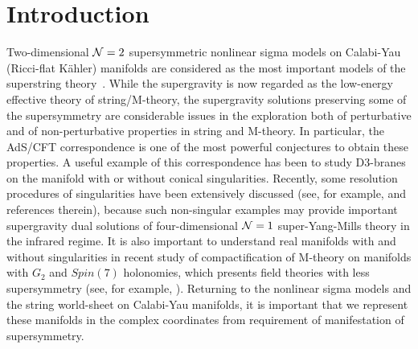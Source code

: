 \documentclass[a4paper,11pt]{article}
\begin{document}
{\begin{titlepage}
\begin{abstract}
\end{abstract}

\end{titlepage}



\section{Introduction} \label{intro}

Two-dimensional ${\cal N}=2$ supersymmetric nonlinear sigma models 
on Calabi-Yau (Ricci-flat K\"{a}hler) manifolds 
are considered as the most important models 
of the superstring theory~\cite{Zu,finite,GVZ,NS}. 
While the supergravity is 
now regarded as the low-energy effective theory of string/M-theory, 
the supergravity solutions preserving some of the supersymmetry 
are considerable issues in the exploration both
of perturbative and of non-perturbative properties 
in string and M-theory. 
In particular,
the AdS/CFT correspondence is one of the most powerful conjectures
to obtain these properties.
A useful example of this correspondence has been to study D3-branes on
the manifold with or without conical singularities.  
Recently, 
some resolution procedures of singularities have been extensively
discussed 
(see, for example, \cite{KleTsey,KleStr,PT,CLP,PapTsey,CGLP} 
and references therein),
because 
such non-singular examples may provide important supergravity dual
solutions of four-dimensional ${\cal N}=1$ super-Yang-Mills theory in
the infrared regime.  
It is also important to understand real manifolds 
with and without singularities 
in recent study of compactification of M-theory on 
manifolds with
$G_2$ and $Spin(7)$ holonomies, which presents 
field theories with less supersymmetry 
(see, for example,
\cite{Spin7,Ach,ES,AW,GLPS}). 
Returning to
the nonlinear sigma models and the string world-sheet 
on Calabi-Yau manifolds, 
it is important that we represent these manifolds in 
the complex coordinates from requirement of 
manifestation of supersymmetry. 

}
\end{document}
